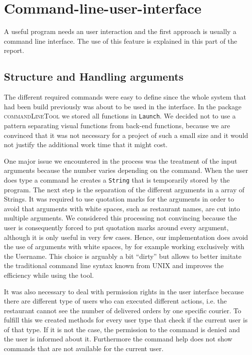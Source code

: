 \section{Command-line-user-interface}
\label{sec:command_line_user_interface}

A useful program needs an user interaction and the first approach is usually a command line 
interface. The use of this feature is explained in this part of the report.

\subsection{Structure and Handling arguments}
\label{sub:structure_and_handling_arguments}

The different required commands were easy to define since the whole system that had been build 
previously was about to be used in the interface. In the package \textsc{commandLineTool} we 
stored all functions in \lstinline|Launch|. We decided not to use a pattern separating
visual functions from back-end functions, because we are convinced that it was not necessary for a
project of such a small size and it would not justify the additional work time that it might 
cost.

One major issue we encountered in the process was the treatment of the input arguments because 
the number varies depending on the command. When the user does type a command he creates a 
\lstinline|String| that is temporarily stored by the program. The next step is the separation of 
the different arguments in a array of Strings. It was required to use quotation marks for the 
arguments in order to avoid that arguments with white spaces, such as restaurant names,  are cut
into multiple arguments.
We considered this processing not convincing because the user is consequently forced to put 
quotation marks around every argument, although it is only useful in very few cases. Hence, 
our implementation does avoid the use of arguments with white spaces, by for example working 
exclusively with the Username. This choice is arguably a bit ``dirty'' but allows to better 
imitate the traditional command line syntax known from \textsc{UNIX} and improves the efficiency 
while using the tool.

It was also necessary to deal with permission rights in the user interface because there are 
different type of users who can executed different actions, i.e. the restaurant cannot see
the number of delivered orders by one specific courier. To fulfill this we created methods for
every user type that check if the current user is of that type. If it is not the case, the 
permission to the command is denied and the user is informed about it. Furthermore the 
command help does not show commands that are not available for the current user.

